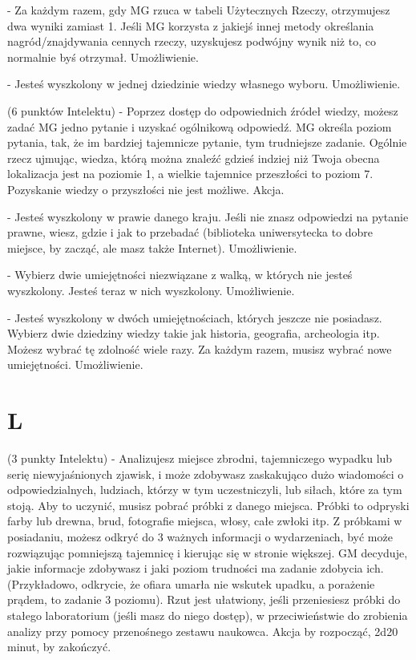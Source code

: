 { - Za każdym razem, gdy MG rzuca w tabeli Użytecznych Rzeczy, otrzymujesz dwa wyniki zamiast 1. Jeśli MG korzysta z jakiejś innej metody określania nagród/znajdywania cennych rzeczy, uzyskujesz podwójny wynik niż to, co normalnie byś otrzymał. Umożliwienie.

 - Jesteś wyszkolony w jednej dziedzinie wiedzy własnego wyboru. Umożliwienie.

 (6 punktów Intelektu) - Poprzez dostęp do odpowiednich źródeł wiedzy, możesz zadać MG jedno pytanie i uzyskać ogólnikową odpowiedź. MG określa poziom pytania, tak, że im bardziej tajemnicze pytanie, tym trudniejsze zadanie. Ogólnie rzecz ujmując, wiedza, którą można znaleźć gdzieś indziej niż Twoja obecna lokalizacja jest na poziomie 1, a wielkie tajemnice przeszłości to poziom 7. Pozyskanie wiedzy o przyszłości nie jest możliwe. Akcja.

 - Jesteś wyszkolony w prawie danego kraju. Jeśli nie znasz odpowiedzi na pytanie prawne, wiesz, gdzie i jak to przebadać (biblioteka uniwersytecka to dobre miejsce, by zacząć, ale masz także Internet). Umożliwienie.

 - Wybierz dwie umiejętności niezwiązane z walką, w których nie jesteś wyszkolony. Jesteś teraz w nich wyszkolony. Umożliwienie.

 - Jesteś wyszkolony w dwóch umiejętnościach, których jeszcze nie posiadasz. Wybierz dwie dziedziny wiedzy takie jak historia, geografia, archeologia itp. Możesz wybrać tę zdolność wiele razy. Za każdym razem, musisz wybrać nowe umiejętności. Umożliwienie.

\section{L}

 (3 punkty Intelektu) - Analizujesz miejsce zbrodni, tajemniczego wypadku lub serię niewyjaśnionych zjawisk, i może zdobywasz zaskakująco dużo wiadomości o odpowiedzialnych, ludziach, którzy w tym uczestniczyli, lub siłach, które za tym stoją. Aby to uczynić, musisz pobrać próbki z danego miejsca. Próbki to odpryski farby lub drewna, brud, fotografie miejsca, włosy, całe zwłoki itp. Z próbkami w posiadaniu, możesz odkryć do 3 ważnych informacji o wydarzeniach, być może rozwiązując pomniejszą tajemnicę i kierując się w stronie większej. GM decyduje, jakie informacje zdobywasz i jaki poziom trudności ma zadanie zdobycia ich. (Przykładowo, odkrycie, że ofiara umarła nie wskutek upadku, a porażenie prądem, to zadanie 3 poziomu). Rzut jest ułatwiony, jeśli przeniesiesz próbki do stałego laboratorium (jeśli masz do niego dostęp), w przeciwieństwie do zrobienia analizy przy pomocy przenośnego zestawu naukowca. Akcja by rozpocząć, 2d20 minut, by zakończyć. 

}
